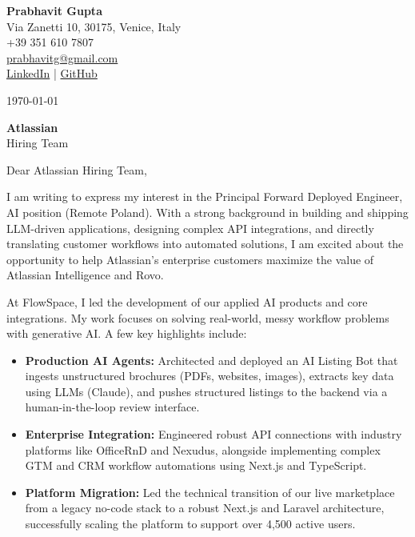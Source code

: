 \documentclass[11pt,a4paper]{article}
\begin{document}
\begin{flushright}
\textbf{Prabhavit Gupta}\\
Via Zanetti 10, 30175, Venice, Italy\\
+39 351 610 7807\\
\href{mailto:prabhavitg@gmail.com}{prabhavitg@gmail.com}\\
\href{https://www.linkedin.com/in/prabhavit/}{LinkedIn} | \href{https://github.com/prab-gupta}{GitHub}
\end{flushright}

\vspace{2em}

\today

\vspace{1em}

\textbf{Atlassian}\\
Hiring Team

\vspace{1.5em}

Dear Atlassian Hiring Team,

I am writing to express my interest in the Principal Forward Deployed Engineer, AI position (Remote Poland). With a strong background in building and shipping LLM-driven applications, designing complex API integrations, and directly translating customer workflows into automated solutions, I am excited about the opportunity to help Atlassian's enterprise customers maximize the value of Atlassian Intelligence and Rovo.

At FlowSpace, I led the development of our applied AI products and core integrations. My work focuses on solving real-world, messy workflow problems with generative AI. A few key highlights include:

\begin{itemize}
    \item \textbf{Production AI Agents:} Architected and deployed an AI Listing Bot that ingests unstructured brochures (PDFs, websites, images), extracts key data using LLMs (Claude), and pushes structured listings to the backend via a human-in-the-loop review interface.
    \item \textbf{Enterprise Integration:} Engineered robust API connections with industry platforms like OfficeRnD and Nexudus, alongside implementing complex GTM and CRM workflow automations using Next.js and TypeScript.
    \item \textbf{Platform Migration:} Led the technical transition of our live marketplace from a legacy no-code stack to a robust Next.js and Laravel architecture, successfully scaling the platform to support over 4,500 active users.
\end{itemize}
\end{document}
